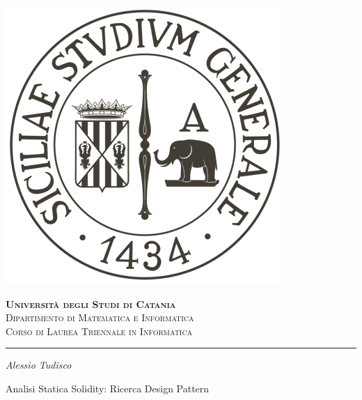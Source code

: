 \begin{titlepage}
	
\centering

\includegraphics[scale=0.25]{components/images/university_logo.png}

\bigskip

\gdef\@phd@university{
	{\LARGE \bfseries Universit\`{a} degli Studi di Catania}\\ 
	{\large Dipartimento di Matematica e Informatica}\\ 
	{Corso di Laurea Triennale in Informatica}\\
	\bigskip}

\textsc{\@phd@university}\par

\hrule

\bigskip

\bigskip

\bigskip

\bigskip

\bigskip

\bigskip

{\itshape \large
	Alessio Tudisco\par
}

\bigskip

\bigskip

\bigskip

\bigskip

\bigskip

\bigskip

{\Large Analisi Statica Solidity: Ricerca Design Pattern}\par


\end{titlepage}
